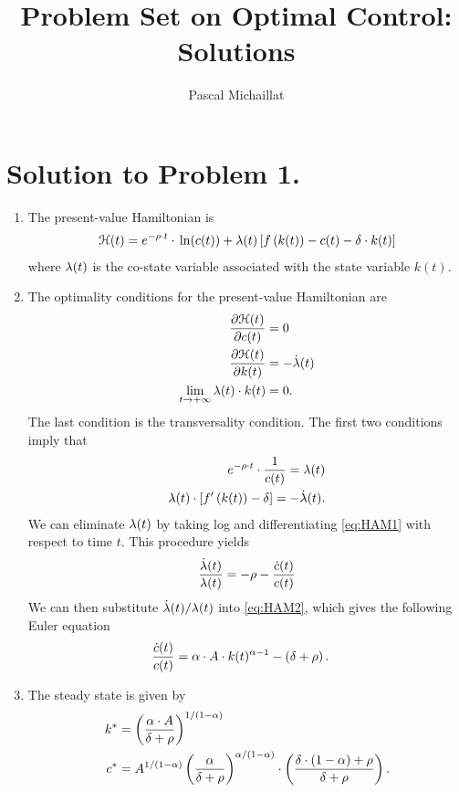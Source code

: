 \documentclass[letterpaper,12pt,leqno]{article}
\begin{document}
\title{Problem Set on Optimal Control: Solutions}
\author{Pascal Michaillat}
\date{}

\begin{titlepage}
\maketitle
\end{titlepage}

\section*{Solution to Problem 1.}

\begin{enumerate}
\item The present-value Hamiltonian is
\begin{align*}
\Hc(t)=e^{-\rho\cdot  t}\cdot \ln{c(t)} +\l(t) \bs{f\bp{k(t)} -c(t)-\d\cdot  k(t)}
\end{align*}
where $\lambda(t)$ is the co-state variable associated with the state variable $k(t)$.
\item The optimality conditions for the present-value Hamiltonian are
\begin{align*}
\frac{\partial \mathcal{H}(t)}{\partial c(t)} &=0\\
\frac{\partial \mathcal{H}(t)}{\partial k(t)} &=-\dot{\lambda}(t)\\
\lim_{t\to+\infty}\lambda(t)\cdot k(t)&=0.
\end{align*}
The last condition is the transversality condition. The first two conditions imply that 
\begin{align}
e^{-\rho \cdot t}\cdot \frac{1}{c(t)} =\lambda(t)\label{eq:HAM1} \\
\lambda(t)\cdot  \left[ f'\left( k(t) \right) -\delta \right] =-\dot{\lambda}(t).\label{eq:HAM2}
\end{align}
We can eliminate $\lambda(t)$ by taking log and differentiating \eqref{eq:HAM1} with respect to time $t$. This procedure yields
\begin{align*}
\frac{\dot{\lambda}(t)}{\lambda(t)}=-\rho -\frac{\dot{c}(t)}{c(t)}
\end{align*}
We can then substitute $\dot{\lambda}(t)/\lambda(t)$ into \eqref{eq:HAM2}, which gives the following Euler equation
\begin{align*}
\frac{\dot{c}(t)}{c(t)} &=\alpha\cdot A\cdot k(t)^{\alpha -1}-\left( \delta +\rho \right) .
\end{align*}
\item The steady state is given by
\begin{align*}
k^*&=\left( \frac{\alpha\cdot A}{\delta +\rho} \right) ^{1/\left( 1-\alpha \right)}\\
c^*&=A^{1/\left( 1-\alpha \right)}\left( \frac{\alpha}{\delta +\rho} \right)^{\alpha /\left( 1-\alpha \right)}\cdot \left( \frac{\delta \cdot \left( 1-\alpha \right) +\rho}{\delta +\rho} \right).
\end{align*}
\end{enumerate}
\end{document}
